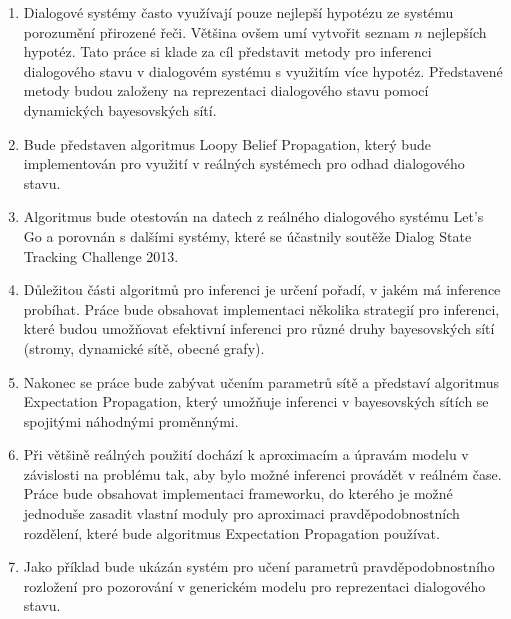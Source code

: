 \begin{enumerate}
\item Dialogové systémy často využívají pouze nejlepší hypotézu ze systému porozumění přirozené řeči.
    Většina ovšem umí vytvořit seznam $n$ nejlepších hypotéz.
    Tato práce si klade za cíl představit metody pro inferenci dialogového stavu v dialogovém systému s využitím více hypotéz.
    Představené metody budou založeny na reprezentaci dialogového stavu pomocí dynamických bayesovských sítí.
\item Bude představen algoritmus Loopy Belief Propagation, který bude implementován pro využití v reálných systémech pro odhad dialogového stavu.
\item Algoritmus bude otestován na datech z reálného dialogového systému Let's Go a porovnán s dalšími systémy, které se účastnily soutěže Dialog State Tracking Challenge 2013.
\item Důležitou části algoritmů pro inferenci je určení pořadí, v jakém má inference probíhat.
    Práce bude obsahovat implementaci několika strategií pro inferenci, které budou umožňovat efektivní inferenci pro různé druhy bayesovských sítí (stromy, dynamické sítě, obecné grafy).
\item Nakonec se práce bude zabývat učením parametrů sítě a představí algoritmus Expectation Propagation, který umožňuje inferenci v bayesovských sítích se spojitými náhodnými proměnnými.
\item Při většině reálných použití dochází k aproximacím a úpravám modelu v závislosti na problému tak, aby bylo možné inferenci provádět v reálném čase.
Práce bude obsahovat implementaci frameworku, do kterého je možné jednoduše zasadit vlastní moduly pro aproximaci pravděpodobnostních rozdělení, které bude algoritmus Expectation Propagation používat.
\item Jako příklad bude ukázán systém pro učení parametrů pravděpodobnostního rozložení pro pozorování v generickém modelu pro reprezentaci dialogového stavu.
\end{enumerate}
